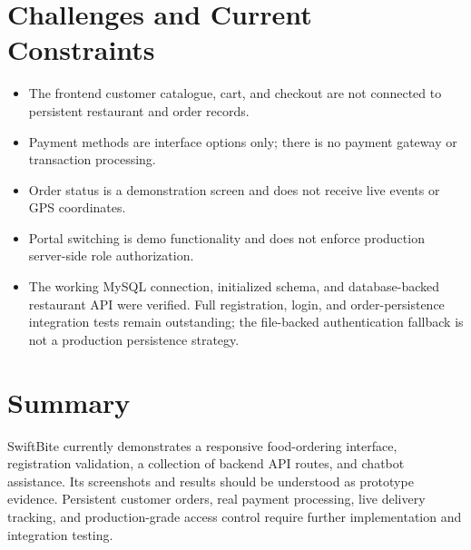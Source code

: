 \section{Challenges and Current Constraints}

\begin{itemize}
    \item The frontend customer catalogue, cart, and checkout are not connected to persistent restaurant and order records.
    \item Payment methods are interface options only; there is no payment gateway or transaction processing.
    \item Order status is a demonstration screen and does not receive live events or GPS coordinates.
    \item Portal switching is demo functionality and does not enforce production server-side role authorization.
    \item The working MySQL connection, initialized schema, and database-backed restaurant API were verified. Full registration, login, and order-persistence integration tests remain outstanding; the file-backed authentication fallback is not a production persistence strategy.
\end{itemize}

\section{Summary}

SwiftBite currently demonstrates a responsive food-ordering interface, registration validation, a collection of backend API routes, and chatbot assistance. Its screenshots and results should be understood as prototype evidence. Persistent customer orders, real payment processing, live delivery tracking, and production-grade access control require further implementation and integration testing.

